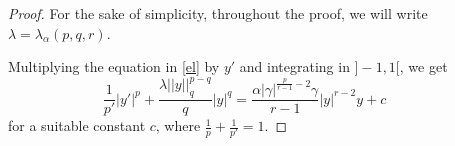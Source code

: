 \documentclass{amsart}
\theoremstyle{definition}
\newtheorem{rem}[thm]{Remark}
\theoremstyle{remark}
\begin{document}
\begin{proof}
For the sake of simplicity, throughout the proof, we will write $\lambda=\lambda_\alpha(p,q,r)$.

Multiplying the equation in \eqref{el} by $y'$ and integrating in $] -1,1[$, we get
\begin{equation}
\label{inel1d}
\frac{1}{p'} |y'|^p + \frac{\lambda ||y||_q^{p-q}}{q}|y|^q = \frac{ \alpha |\gamma|^{\frac p {r-1}-2}\gamma }{r-1} |y|^{r-2}y + c\qquad\
\end{equation}
for a suitable constant $c$, where $\frac1p + \frac{1}{p'}=1$. 


\end{proof}
\end{document}
